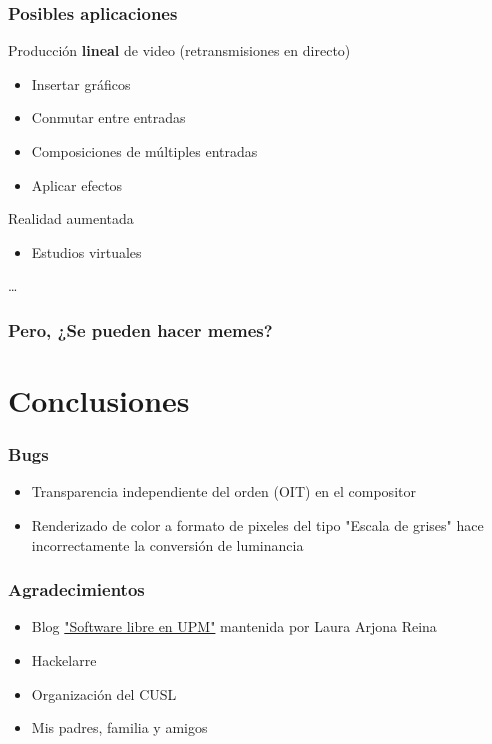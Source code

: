 \documentclass{beamer}
\begin{document}
\begin{frame}[t] \frametitle{Posibles aplicaciones}
	\begin{itemize}
		\begin{item}
			Producción \textbf{lineal} de video (retransmisiones en directo)
			\begin{itemize}
				\item{Insertar gráficos}
				\item{Conmutar entre entradas}
				\item{Composiciones de múltiples entradas}
				\item{Aplicar efectos}
			\end{itemize}
		\end{item}
		\begin{item}
			Realidad aumentada
			\begin{itemize}
				\item{Estudios virtuales}
			\end{itemize}
		\end{item}
		\begin{item}
			\ldots
		\end{item}
	\end{itemize}
\end{frame}

\begin{frame} \frametitle{Pero, ¿Se pueden hacer memes?}
\end{frame}

%
%
\section{Conclusiones}

\begin{frame} \frametitle{Bugs}
	\begin{itemize}
		\item{Transparencia independiente del orden (OIT) en el compositor}
		\item{Renderizado de color a formato de pixeles del tipo "Escala de grises" hace incorrectamente la conversión de luminancia}
	\end{itemize}
\end{frame}

\begin{frame} \frametitle{Agradecimientos}
	\begin{itemize}
		\item{Blog \href{http://blogs.upm.es/softwarelibre/}{"Software libre en UPM"} mantenida por Laura Arjona Reina}
		\item{Hackelarre}
		\item{Organización del CUSL}
		\item{Mis padres, familia y amigos}
	\end{itemize}
\end{frame}
\end{document}
